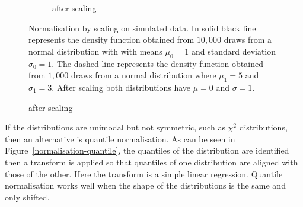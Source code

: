 \begin{figure}[ht]
\begin{subfigure}[b]{.5\textwidth}
\caption{after scaling}
\end{subfigure}
{Normalisation by scaling on simulated data.}
{
In solid black line represents the density function obtained from $10,000$ draws from a normal distribution
with with means $\mu_0=1$ and standard deviation $\sigma_0=1$.
The dashed line represents the density function obtained from $1,000$ draws from a normal distribution
where $\mu_1=5$ and $\sigma_1=3$.
After scaling both distributions have $\mu=0$ and $\sigma=1$.
}
\end{figure}


If the distributions are unimodal but not symmetric, such as $\chi^2$ distributions, then an alternative is quantile normalisation.
As can be seen in Figure~\ref{normalisation-quantile}, the quantiles of the distribution are identified
then a transform is applied so that quantiles of one distribution are aligned with those of the other.
Here the transform is a simple linear regression.
Quantile normalisation works well when the shape of the distributions is the same and only shifted.


